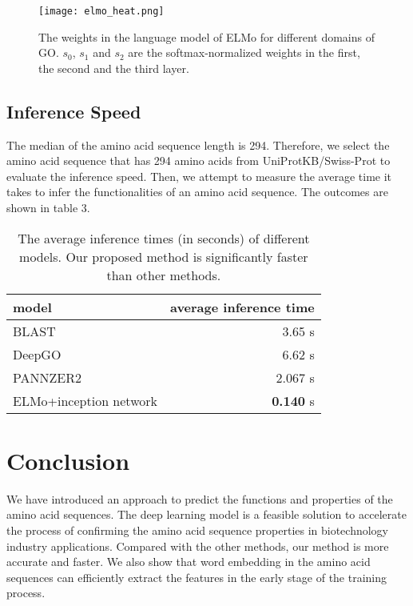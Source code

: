 \documentclass{article}
\begin{document}
            \begin{figure}[h]
            	\texttt{[image: elmo\_heat.png]}
            	\centering
            	\caption{The weights in the language model of ELMo for different domains of GO. $s_{0}$, $s_{1}$ and $s_{2}$ are the softmax-normalized weights in the first, the second and the third layer.}
            \end{figure}

    \subsection{Inference Speed}
        The median of the amino acid sequence length is 294. Therefore, we select the amino acid sequence that has 294 amino acids from UniProtKB/Swiss-Prot to evaluate the inference speed. Then, we attempt to measure the average time it takes to infer the functionalities of an amino acid sequence. The outcomes are shown in table 3.

        \begin{table}
        	\centering
        	\begin{tabular}{ | l | r | } 
        		\hline
                model & average inference time \\
                \hline
                \hline
        		BLAST&  3.65 s\\ 
                \hline
                DeepGO & 6.62 s\\
                \hline
                PANNZER2 & 2.067 s\\
                \hline
                ELMo+inception network & \textbf{0.140} s \\
                \hline
        	\end{tabular}
        	\caption{The average inference times (in seconds) of different models.  Our proposed method is significantly faster than other methods.}
        \end{table}

\section{Conclusion}
    We have introduced an approach to predict the functions and properties of the amino acid sequences. The deep learning model is a feasible solution to accelerate the process of confirming the amino acid sequence properties in biotechnology industry applications. Compared with the other methods, our method is more accurate and faster. We also show that word embedding in the amino acid sequences can efficiently extract the features in the early stage of the training process. 
    
\medskip
\small


\end{document}
